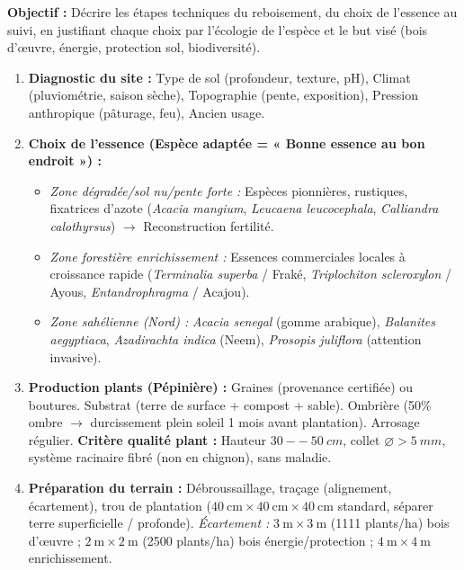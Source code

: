 \documentclass[11pt]{article}
\begin{document}
\begin{methode}
    \textbf{Objectif :} Décrire les étapes techniques du reboisement, du choix de l'essence au suivi, en justifiant chaque choix par l'écologie de l'espèce et le but visé (bois d'œuvre, énergie, protection sol, biodiversité).
    \begin{enumerate}
        \item \textbf{Diagnostic du site :} Type de sol (profondeur, texture, pH), Climat (pluviométrie, saison sèche), Topographie (pente, exposition), Pression anthropique (pâturage, feu), Ancien usage.
        \item \textbf{Choix de l'essence (Espèce adaptée = « Bonne essence au bon endroit ») :}
              \begin{itemize}
                  \item \textit{Zone dégradée/sol nu/pente forte :} Espèces pionnières, rustiques, fixatrices d'azote (\emph{Acacia mangium}, \emph{Leucaena leucocephala}, \emph{Calliandra calothyrsus}) $\rightarrow$ Reconstruction fertilité.
                  \item \textit{Zone forestière enrichissement :} Essences commerciales locales à croissance rapide (\emph{Terminalia superba} / Fraké, \emph{Triplochiton scleroxylon} / Ayous, \emph{Entandrophragma} / Acajou).
                  \item \textit{Zone sahélienne (Nord) :} \emph{Acacia senegal} (gomme arabique), \emph{Balanites aegyptiaca}, \emph{Azadirachta indica} (Neem), \emph{Prosopis juliflora} (attention invasive).
              \end{itemize}
        \item \textbf{Production plants (Pépinière) :} Graines (provenance certifiée) ou boutures. Substrat (terre de surface + compost + sable). Ombrière (50\% ombre $\rightarrow$ durcissement plein soleil 1 mois avant plantation). Arrosage régulier. \textbf{Critère qualité plant :} Hauteur $\SI{30}{--}\SI{50}{cm}$, collet $\varnothing > \SI{5}{mm}$, système racinaire fibré (non en chignon), sans maladie.
        \item \textbf{Préparation du terrain :} Débroussaillage, traçage (alignement, écartement), trou de plantation ($\SI{40}{\cm}\times\SI{40}{\cm}\times\SI{40}{\cm}$ standard, séparer terre superficielle / profonde). \textit{Écartement :} $\SI{3}{\m}\times\SI{3}{\m}$ (1111 plants/ha) bois d'œuvre ; $\SI{2}{\m}\times\SI{2}{\m}$ (2500 plants/ha) bois énergie/protection ; $\SI{4}{\m}\times\SI{4}{\m}$ enrichissement.

\end{enumerate}
\end{methode}
\end{document}
